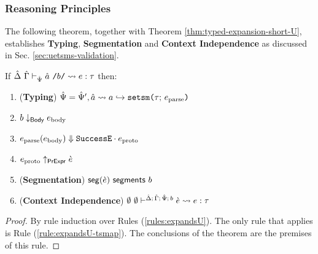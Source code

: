 

\subsubsection{Reasoning Principles}
The following theorem, together with Theorem \ref{thm:typed-expansion-short-U}, establishes \textbf{Typing}, \textbf{Segmentation} and \textbf{Context Independence} as discussed in Sec. \ref{sec:uetsms-validation}.

\begingroup
\def\thetheorem{\ref{thm:tsc-SES}}
\begin{theorem}
If $\hat{\Delta}~\hat{\Gamma} \vdash_{\hat{\Psi}} \hat{a}~\texttt{/}b\texttt{/} \leadsto e : \tau$ then:
\begin{enumerate}
\item (\textbf{Typing}) $\hat{\Psi} = \hat{\Psi}', \hat{a} \leadsto a \hookrightarrow \texttt{setsm}\texttt{(}\tau;\,e_\text{parse}\texttt{)}$
\item $b \downarrow_\mathsf{Body} e_\text{body}$
\item $e_\text{parse}(e_\text{body}) \Downarrow \mathtt{SuccessE}\cdot e_\text{proto}$
\item $e_\text{proto} \uparrow_\mathsf{PrExpr} \grave{e}$
\item (\textbf{Segmentation}) $\mathsf{seg}(\grave{e})~\mathsf{segments}~b$
\item (\textbf{Context Independence}) $\emptyset~\emptyset\vdash^{\hat{\Delta};\,\hat{\Gamma};\,\hat{\Psi};\,b} \grave{e} \leadsto e : \tau$ 
\end{enumerate}
\end{theorem}
\begin{proof} By rule induction over Rules (\ref{rules:expandsU}). The only rule that applies is Rule (\ref{rule:expandsU-tsmap}). The conclusions of the theorem are the premises of this rule.
\end{proof}
\endgroup


